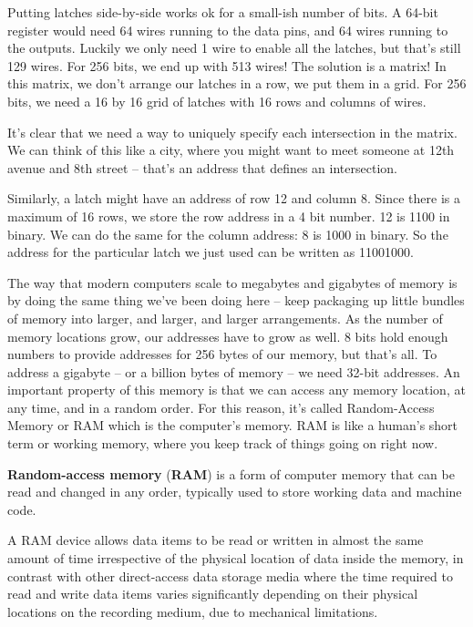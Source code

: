 
Putting latches side-by-side works ok for a small-ish number of bits. A 64-bit register would need 64 wires running
to the data pins, and 64 wires running to the outputs. Luckily we only need 1 wire to enable all the latches, but
that's still 129 wires. For 256 bits, we end up with 513 wires! The solution is a matrix! In this matrix, we don't
arrange our latches in a row, we put them in a grid. For 256 bits, we need a 16 by 16 grid of latches with 16 rows
and columns of wires.


It's clear that we need a way to uniquely specify each intersection in the matrix. We can think of this like a city,
where you might want to meet someone at 12th avenue and 8th street -- that's an address that defines an intersection.

\be
Similarly, a latch might have an address of row 12 and column 8. Since there is a maximum of 16 rows, we store the row
address in a 4 bit number. 12 is 1100 in binary. We can do the same for the column address: 8 is 1000 in binary. So
the address for the particular latch we just used can be written as 11001000.
\ee

The way that modern computers scale to megabytes and gigabytes of memory is by doing the same thing we've been doing
here -- keep packaging up little bundles of memory into larger, and larger, and larger arrangements. As the number of
memory locations grow, our addresses have to grow as well. 8 bits hold enough numbers to provide addresses for 256
bytes of our memory, but that's all. To address a gigabyte – or a billion bytes of memory – we need 32-bit addresses.
An important property of this memory is that we can access any memory location, at any time, and in a random order.
For this reason, it's called Random-Access Memory or RAM which is the computer's memory. RAM is like a human's short
term or working memory, where you keep track of things going on right now.

\textbf{Random-access memory} (\textbf{RAM}) is a form of computer memory that can be read and changed in any order,
typically used to store working data and machine code.
\ed

A RAM device allows data items to be read or written in almost the same amount of time irrespective of the physical
location of data inside the memory, in contrast with other direct-access data storage media where the time required
to read and write data items varies significantly depending on their physical locations on the recording medium, due
to mechanical limitations.

